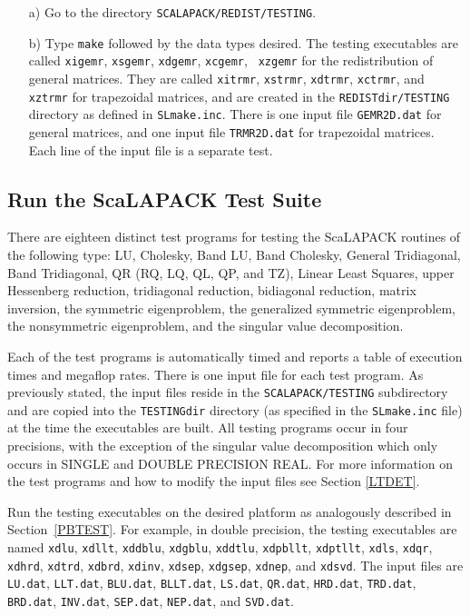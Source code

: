 \documentclass[11pt]{report}
\newcommand{\dent}{\hspace*{\parindent}}
\begin{document}
\begin{itemize}
\item[a)]
Go to the directory {\tt SCALAPACK/REDIST/TESTING}.

\item[b)]
Type {\tt make} followed by the data types desired.  The testing executables
are called {\tt xigemr}, {\tt xsgemr}, {\tt xdgemr}, {\tt xcgemr}, {\tt
xzgemr} for the redistribution of general matrices.  They are called
{\tt xitrmr}, {\tt xstrmr}, {\tt xdtrmr}, {\tt xctrmr}, and {\tt xztrmr}
for trapezoidal
matrices, and are created in the {\tt REDISTdir/TESTING} directory as
defined in {\tt SLmake.inc}.
There is one input file {\tt GEMR2D.dat} for general matrices, and one
input file {\tt TRMR2D.dat} for trapezoidal matrices.
Each line of the input file is a separate test.
\end{itemize}

\subsection{Run the ScaLAPACK Test Suite}
\label{SLTEST}
\dent
There are eighteen distinct test programs for testing the ScaLAPACK
routines of the following type:  LU, Cholesky, Band LU, Band Cholesky,
General Tridiagonal, Band Tridiagonal, QR (RQ, LQ, QL, QP, and TZ), 
Linear Least Squares, upper Hessenberg reduction, tridiagonal reduction,
bidiagonal reduction, matrix inversion, the symmetric eigenproblem,
the generalized symmetric eigenproblem, the nonsymmetric eigenproblem,
and the singular value decomposition.

Each of the test programs is automatically timed
and reports a table of execution times and megaflop rates.
There is one input file for each test program.
As previously stated, the input files reside in the
{\tt SCALAPACK/TESTING} subdirectory and are copied into the
{\tt TESTINGdir} directory (as specified in the {\tt SLmake.inc} file)
at the time the executables are built.  All testing programs occur in
four precisions, with the exception of the singular value decomposition which
only occurs in SINGLE and DOUBLE PRECISION REAL.
For more information on the test programs and how to modify the
input files see Section \ref{LTDET}.

Run the testing executables on the desired platform as analogously
described in Section~\ref{PBTEST}.  For example, in double precision,
the testing executables are named
{\tt xdlu}, {\tt xdllt}, {\tt xddblu}, {\tt xdgblu}, {\tt xddtlu},
{\tt xdpbllt}, {\tt xdptllt}, {\tt xdls}, {\tt xdqr}, {\tt xdhrd},
{\tt xdtrd}, {\tt xdbrd}, {\tt xdinv}, {\tt xdsep}, {\tt xdgsep}, {\tt xdnep},
and {\tt xdsvd}.
The input files are {\tt LU.dat}, {\tt LLT.dat},
{\tt BLU.dat}, {\tt BLLT.dat}, {\tt LS.dat}, {\tt QR.dat},
{\tt HRD.dat}, {\tt TRD.dat}, {\tt BRD.dat}, {\tt INV.dat}, 
{\tt SEP.dat}, {\tt NEP.dat},
and {\tt SVD.dat}. 
 
\end{document}
